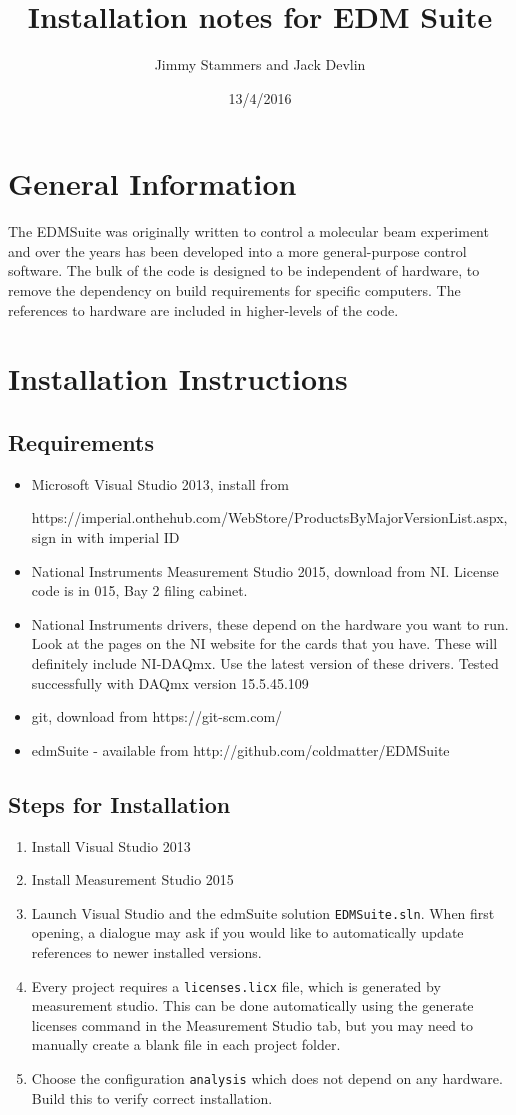 \documentclass{article}
\title{Installation notes for EDM Suite }
\author{Jimmy Stammers and Jack Devlin}
\date{13/4/2016}
\begin{document}
\maketitle
\section{General Information}
The EDMSuite was originally written to control a molecular beam experiment and over the years has been developed into a more general-purpose control software. The bulk of the code is designed to be independent of hardware, to remove the dependency on build requirements for specific computers. The references to hardware are included in higher-levels of the code.
\section{Installation Instructions}
\subsection{Requirements}
\begin{itemize}
\item Microsoft Visual Studio 2013, install from 

https://imperial.onthehub.com/WebStore/ProductsByMajorVersionList.aspx, sign in with imperial ID
\item National Instruments Measurement Studio 2015, download from NI. License code is in 015, Bay 2 filing cabinet.
\item National Instruments drivers, these depend on the hardware you want to run.  Look at the pages on the NI website for the cards that you have. These will definitely include NI-DAQmx. Use the latest version of these drivers. Tested successfully with DAQmx version 15.5.45.109
\item git, download from https://git-scm.com/
\item edmSuite - available from http://github.com/coldmatter/EDMSuite
\end{itemize}

\subsection{Steps for Installation}
\begin{enumerate}
\item Install Visual Studio 2013
\item Install Measurement Studio 2015 
\item Launch Visual Studio and the edmSuite solution \lstinline|EDMSuite.sln|. When first opening, a dialogue may ask if you would like to automatically update references to newer installed versions.
\item Every project requires a \lstinline|licenses.licx| file, which is generated by measurement studio. This can be done automatically using the generate licenses command in the Measurement Studio tab, but you may need to manually create a blank file in each project folder.
\item Choose the configuration \lstinline|analysis| which does not depend on any hardware. Build this to verify correct installation. 
\end{enumerate}
\end{document}
